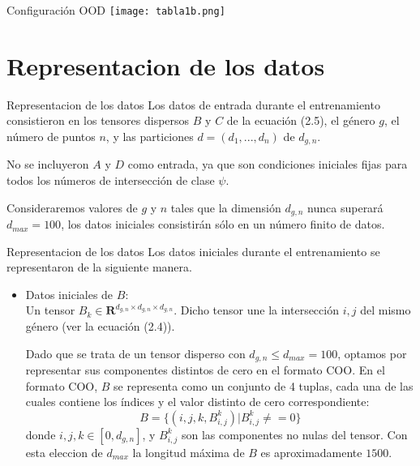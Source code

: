 \documentclass{beamer}
\begin{document}
\begin{frame}{Configuración OOD}
    \texttt{[image: tabla1b.png]}
\end{frame}

\section{Representacion de los datos}
\begin{frame}{Representacion de los datos}
    Los datos de entrada durante el entrenamiento consistieron en los tensores dispersos $B$ y $C$ de la ecuación (2.5), el género $g$, el número de puntos $n$, y las particiones $d = (d_1, . . . , d_n)$ de $d_{g,n}.$
    \newline
    \pause

    No se incluyeron $A$ y $D$ como entrada, ya que son condiciones iniciales fijas para todos los números de intersección de clase $\psi$.
    \newline
    \pause
    
    Consideraremos valores de $g$ y $n$ tales que la dimensión $d_{g,n}$ nunca superará $d_{max} = 100$, los datos iniciales consistirán sólo en un número finito de datos. 
\end{frame}

\begin{frame}{Representacion de los datos}
    Los datos iniciales durante el entrenamiento se representaron de la siguiente manera.
    \begin{itemize}
        \item Datos iniciales de $B$: \\
        Un tensor $B_{k}\in \mathbf{R}^{d_{g,n}\times d_{g,n}\times d_{g,n}}$. 
        Dicho tensor une la intersección $i,j$ del mismo género (ver la ecuación (2.4)). 
        \newline
        \pause
        
        Dado que se trata de un tensor disperso con $d_{g,n} \leq d_{max} = 100$, optamos por representar sus componentes distintos de cero en el formato COO. En el formato COO, $B$ se representa como un conjunto de 4 tuplas, cada una de las cuales contiene los índices y el valor distinto de cero correspondiente:
        $$B=\{ (i,j,k,B^{k}_{i,j}) | B^{k}_{i,j}\neq = 0 \}$$
        donde $i, j, k \in [0, d_{g,n} ]$, y $B^{k}_{i,j}$ son las componentes no nulas del tensor. Con esta eleccion de $d_{max}$ la longitud máxima de $B$ es aproximadamente $1500$.
    \end{itemize}
\end{frame}
\end{document}
